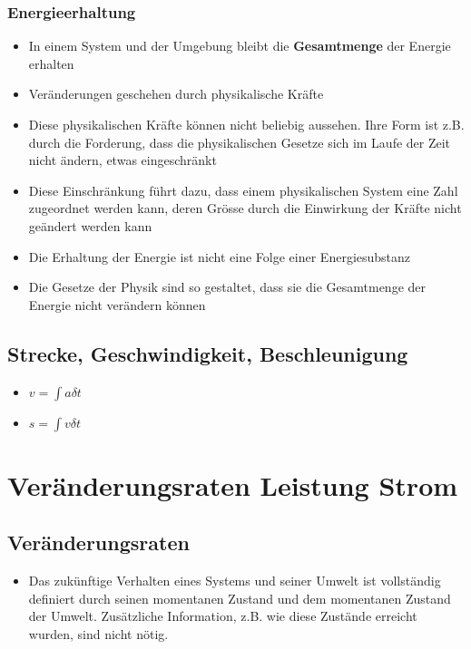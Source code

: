 \documentclass[8pt,a4paper]{scrartcl}
\begin{document}
\begin{multicols*}{3}
		\subsubsection{Energieerhaltung}			
			\begin{itemize}\itemsep0pt		
				\item In einem System und der Umgebung bleibt die \textbf{Gesamtmenge} der Energie erhalten			
				\item Veränderungen geschehen durch physikalische Kräfte
				\item Diese physikalischen Kräfte können nicht beliebig aussehen. Ihre Form ist z.B. durch die Forderung, dass die physikalischen Gesetze sich im Laufe der Zeit nicht ändern, etwas eingeschränkt
				\item Diese Einschränkung führt dazu, dass einem physikalischen System eine Zahl zugeordnet werden kann, deren Grösse durch die Einwirkung der Kräfte nicht geändert werden kann
				\item Die Erhaltung der Energie ist nicht eine Folge einer Energiesubstanz
				\item Die Gesetze der Physik sind so gestaltet, dass sie die Gesamtmenge der Energie nicht verändern können
				
			\end{itemize}

		\subsection{Strecke, Geschwindigkeit, Beschleunigung}
			\begin{itemize}\itemsep0pt				
				\item $v=\int a \delta t$
				\item $s=\int v \delta t$
			\end{itemize}			
			
	\section{Veränderungsraten Leistung Strom}
		\subsection{Veränderungsraten}
			\begin{itemize}\itemsep0pt			
				\item Das zukünftige Verhalten eines Systems und seiner Umwelt ist vollständig definiert durch seinen momentanen Zustand und dem momentanen Zustand der Umwelt. Zusätzliche Information, z.B. wie diese Zustände erreicht wurden, sind nicht nötig.
				

\end{itemize}
\end{multicols*}
\end{document}
